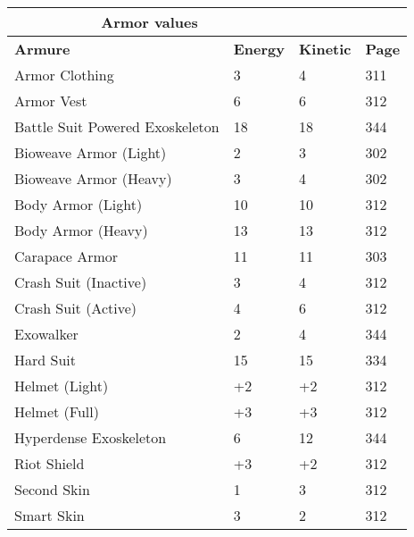 \begin{table} \begin{tabular}{|l|l|l|l|} \hline

\multicolumn{2}{|c|}{\textbf{Armor values}}	\\ \hline

\textbf{Armure}	&\textbf{Energy} &\textbf{Kinetic}	&\textbf{Page} \\ \hline

Armor Clothing	&3	&4	&311	\\ \hline

Armor Vest	&6	&6	&312	\\ \hline

Battle Suit Powered Exoskeleton	&18	&18	&344	\\ \hline

Bioweave Armor (Light)	&2	&3	&302	\\ \hline

Bioweave Armor (Heavy)	&3	&4	&302	\\ \hline

Body Armor (Light)	&10	&10	&312	\\ \hline

Body Armor (Heavy)	&13	&13	&312	\\ \hline

Carapace Armor	&11	&11	&303	\\ \hline

Crash Suit (Inactive)	&3	&4	&312	\\ \hline

Crash Suit (Active)	&4	&6	&312	\\ \hline

Exowalker	&2	&4	&344	\\ \hline

Hard Suit	&15	&15	&334	\\ \hline

Helmet (Light)	&+2	&+2	&312	\\ \hline

Helmet (Full)	&+3	&+3	&312	\\ \hline

Hyperdense Exoskeleton	&6	&12	&344	\\ \hline

Riot Shield	&+3	&+2	&312	\\ \hline

Second Skin	&1	&3	&312	\\ \hline

Smart Skin	&3	&2	&312	\\ \hline


\end{tabular}
\end{table}

